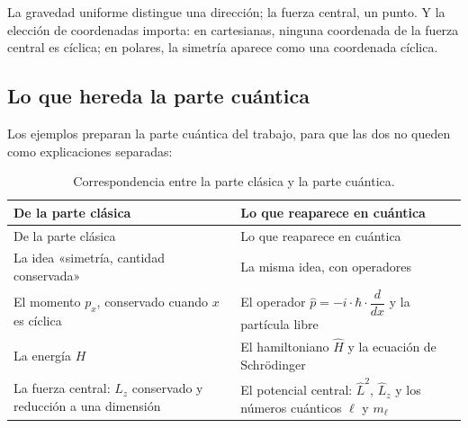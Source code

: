 \documentclass[11pt,a4paper,spanish]{book}
\begin{document}
La gravedad uniforme distingue una dirección; la fuerza central, un
punto. Y la elección de coordenadas importa: en cartesianas, ninguna
coordenada de la fuerza central es cíclica; en polares, la simetría
aparece como una coordenada cíclica.

\subsection{Lo que hereda la parte
cuántica}\label{lo-que-hereda-la-parte-cuuxe1ntica}

Los ejemplos preparan la parte cuántica del trabajo, para que las dos no
queden como explicaciones separadas:

\begin{longtable}[]{@{}
  >{\raggedright\arraybackslash}p{}
  >{\raggedright\arraybackslash}p{}@{}}
\caption{Correspondencia entre la parte clásica y la parte
cuántica.}\tabularnewline
\toprule\noalign{}
\begin{minipage}[b]{\linewidth}\raggedright
De la parte clásica
\end{minipage} & \begin{minipage}[b]{\linewidth}\raggedright
Lo que reaparece en cuántica
\end{minipage} \\
\midrule\noalign{}
\endfirsthead
\toprule\noalign{}
\begin{minipage}[b]{\linewidth}\raggedright
De la parte clásica
\end{minipage} & \begin{minipage}[b]{\linewidth}\raggedright
Lo que reaparece en cuántica
\end{minipage} \\
\midrule\noalign{}
\endhead
\bottomrule\noalign{}
\endlastfoot
La idea «simetría, cantidad conservada» & La misma idea, con
operadores \\
El momento \(p_x\), conservado cuando \(x\) es cíclica & El operador
\(\hat{p} = -i \cdot \hbar \cdot \dfrac{d}{dx}\) y la partícula libre \\
La energía \(H\) & El hamiltoniano \(\hat{H}\) y la ecuación de
Schrödinger \\
La fuerza central: \(L_z\) conservado y reducción a una dimensión & El
potencial central: \(\hat{L}^2\), \(\hat{L}_z\) y los números cuánticos
\(\ell\) y \(m_\ell\) \\
\end{longtable}
\end{document}
